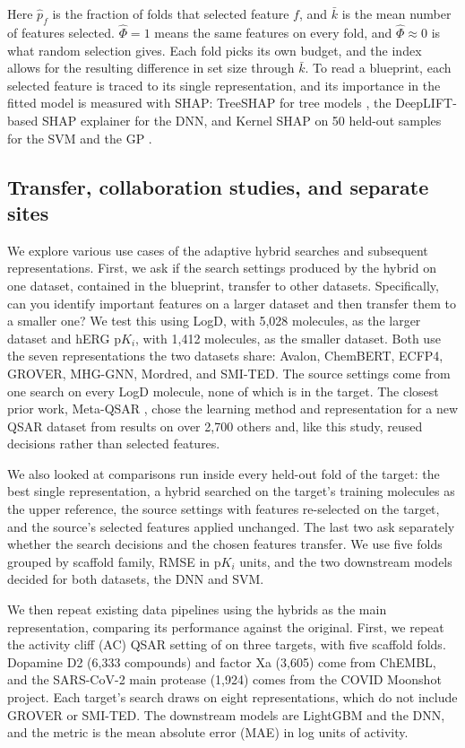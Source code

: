 Here $\hat p_f$ is the fraction of folds that selected feature $f$, and $\bar k$ is the mean number of features selected. $\hat\Phi=1$ means the same features on every fold, and $\hat\Phi \approx 0$ is what random selection gives. Each fold picks its own budget, and the index allows for the resulting difference in set size through $\bar k$. To read a blueprint, each selected feature is traced to its single representation, and its importance in the fitted model is measured with SHAP: TreeSHAP for tree models \citep{Lundberg2020}, the DeepLIFT-based SHAP explainer for the DNN, and Kernel SHAP on 50 held-out samples for the SVM and the GP \citep{Lundberg2017}.

\subsection{Transfer, collaboration studies, and separate sites}\label{sec:method:sites}

We explore various use cases of the adaptive hybrid searches and subsequent representations. First, we ask if the search settings produced by the hybrid on one dataset, contained in the blueprint, transfer to other datasets. Specifically, can you identify important features on a larger dataset and then transfer them to a smaller one? We test this using LogD, with 5,028 molecules, as the larger dataset and hERG $\mathrm{p}K_i$, with 1,412 molecules, as the smaller dataset. Both use the seven representations the two datasets share: Avalon, ChemBERT, ECFP4, GROVER, MHG-GNN, Mordred, and SMI-TED. The source settings come from one search on every LogD molecule, none of which is in the target. The closest prior work, Meta-QSAR \citep{Olier2018}, chose the learning method and representation for a new QSAR dataset from results on over 2,700 others and, like this study, reused decisions rather than selected features. 

We also looked at comparisons run inside every held-out fold of the target: the best single representation, a hybrid searched on the target's training molecules as the upper reference, the source settings with features re-selected on the target, and the source's selected features applied unchanged. The last two ask separately whether the search decisions and the chosen features transfer. We use five folds grouped by scaffold family, RMSE in $\mathrm{p}K_i$ units, and the two downstream models decided for both datasets, the DNN and SVM.

We then repeat existing data pipelines using the hybrids as the main representation, comparing its performance against the original. First, we repeat the activity cliff (AC) QSAR setting of \citet{Dablander2023} on three targets, with five scaffold folds. Dopamine D2 (6,333 compounds) and factor Xa (3,605) come from ChEMBL, and the SARS-CoV-2 main protease (1,924) comes from the COVID Moonshot project. Each target's search draws on eight representations, which do not include GROVER or SMI-TED. The downstream models are LightGBM and the DNN, and the metric is the mean absolute error (MAE) in log units of activity.

